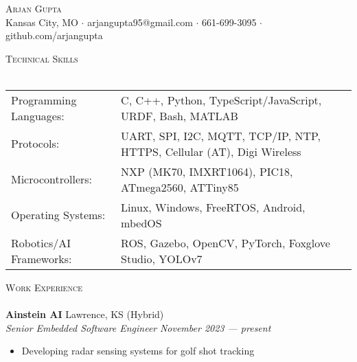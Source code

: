 \documentclass[a4paper]{article}
\newcommand{\lineunder} {
    \vspace*{-8pt} \\
    \hspace*{-18pt} \hrulefill \\
}
\newcommand{\header} [1] {
    {\hspace*{-18pt}\vspace*{6pt} \textsc{#1}}
    \vspace*{-6pt} \lineunder
}
\begin{document}
\vspace*{-40pt}

    

\vspace*{-10pt}
\begin{center}
	{\Huge \scshape {Arjan Gupta}}\\
	Kansas City, MO $\cdot$ arjangupta95@gmail.com $\cdot$ 661-699-3095 $\cdot$ github.com/arjangupta\\
\end{center}

\header{Technical Skills}
\vspace{2mm}
\begin{tabular}{ l l }
	Programming Languages: & C, C++, Python, TypeScript/JavaScript, URDF, Bash, MATLAB \\
    Protocols:             & UART, SPI, I2C, MQTT, TCP/IP, NTP, HTTPS, Cellular (AT), Digi Wireless \\
    Microcontrollers:      & NXP (MK70, IMXRT1064), PIC18, ATmega2560, ATTiny85        \\
    Operating Systems:     & Linux, Windows, FreeRTOS, Android, mbedOS \\
    Robotics/AI Frameworks:   & ROS, Gazebo, OpenCV, PyTorch, Foxglove Studio, YOLOv7 \\
\end{tabular}
\vspace{5mm}

\header{Work Experience}
\vspace{1mm}
\textbf{Ainstein AI} \hfill Lawrence, KS (Hybrid)\\
\textit{Senior Embedded Software Engineer} \hfill \textit{November 2023 --- present}\\
\vspace{-1mm}
\begin{itemize}
    \item Developing radar sensing systems for golf shot tracking
\end{itemize}
\end{document}
